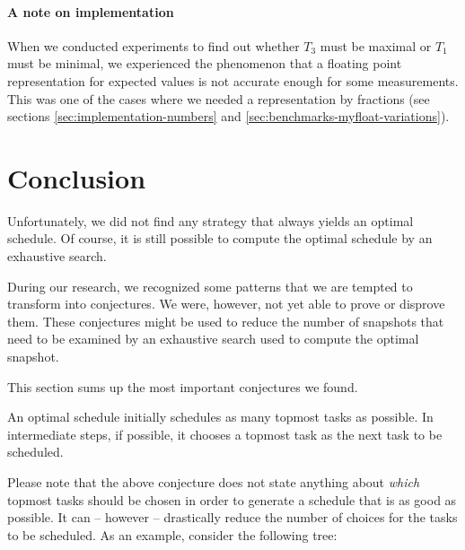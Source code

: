 \paragraph{A note on implementation}
\label{sec:maximizing-t3-minimizing-t1-float-problem}

When we conducted experiments to find out whether $T_3$ must be maximal or $T_1$ must be minimal, we experienced the phenomenon that a floating point representation for expected values is not accurate enough for some measurements. This was one of the cases where we needed a representation by fractions (see sections \ref{sec:implementation-numbers} and \ref{sec:benchmarks-myfloat-variations}).

\section{Conclusion}
\label{sec:p3-conclusion}

Unfortunately, we did not find any strategy that always yields an optimal schedule. Of course, it is still possible to compute the optimal schedule by an exhaustive search.

During our research, we recognized some patterns that we are tempted to transform into conjectures. We were, however, not yet able to prove or disprove them. These conjectures might be used to reduce the number of snapshots that need to be examined by an exhaustive search used to compute the optimal snapshot.

This section sums up the most important conjectures we found.

\begin{conjecture}
  \label{conj:as-many-topmost-as-possibly}
  An optimal schedule initially schedules as many topmost tasks as possible. 
  In intermediate steps, if possible, it chooses a topmost task as the next task to be scheduled.
\end{conjecture}

Please note that the above conjecture does not state anything about \emph{which} topmost tasks should be chosen in order to generate a schedule that is as good as possible. It can -- however -- drastically reduce the number of choices for the tasks to be scheduled. As an example, consider the following tree:

